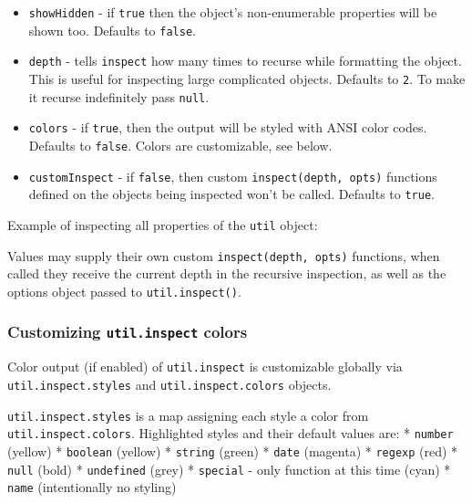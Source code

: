 \begin{itemize}
\item
  \texttt{showHidden} - if \texttt{true} then the object's
  non-enumerable properties will be shown too. Defaults to
  \texttt{false}.
\item
  \texttt{depth} - tells \texttt{inspect} how many times to recurse
  while formatting the object. This is useful for inspecting large
  complicated objects. Defaults to \texttt{2}. To make it recurse
  indefinitely pass \texttt{null}.
\item
  \texttt{colors} - if \texttt{true}, then the output will be styled
  with ANSI color codes. Defaults to \texttt{false}. Colors are
  customizable, see below.
\item
  \texttt{customInspect} - if \texttt{false}, then custom
  \texttt{inspect(depth, opts)} functions defined on the objects being
  inspected won't be called. Defaults to \texttt{true}.
\end{itemize}

Example of inspecting all properties of the \texttt{util} object:

\begin{Shaded}
\begin{Highlighting}[]
 \NormalTok{(}\NormalTok{);}

\NormalTok{(}\NormalTok{: }\NormalTok{, }\NormalTok{: } \NormalTok{\}));}
\end{Highlighting}
\end{Shaded}

Values may supply their own custom \texttt{inspect(depth, opts)}
functions, when called they receive the current depth in the recursive
inspection, as well as the options object passed to
\texttt{util.inspect()}.

\subsubsection{Customizing \texttt{util.inspect}
colors}\label{customizing-util.inspect-colors}

Color output (if enabled) of \texttt{util.inspect} is customizable
globally via \texttt{util.inspect.styles} and
\texttt{util.inspect.colors} objects.

\texttt{util.inspect.styles} is a map assigning each style a color from
\texttt{util.inspect.colors}. Highlighted styles and their default
values are: * \texttt{number} (yellow) * \texttt{boolean} (yellow) *
\texttt{string} (green) * \texttt{date} (magenta) * \texttt{regexp}
(red) * \texttt{null} (bold) * \texttt{undefined} (grey) *
\texttt{special} - only function at this time (cyan) * \texttt{name}
(intentionally no styling)


